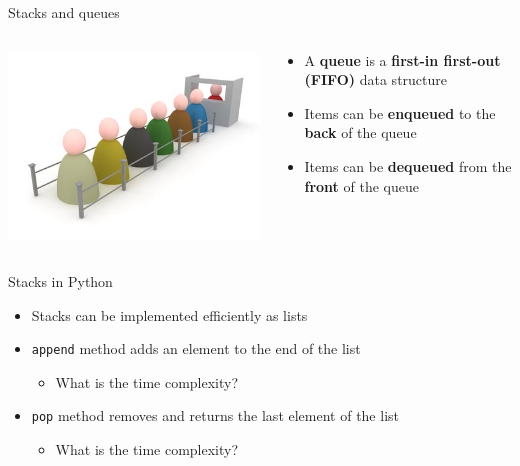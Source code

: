 \begin{frame}{Stacks and queues}
\begin{columns}
\begin{column}{0.3\textwidth}
			\includegraphics[width=\textwidth]{queue}
		\end{column}
		\begin{column}{0.68\textwidth}
			\begin{itemize}
				\item A \textbf{queue} is a \textbf{first-in first-out (FIFO)} data structure
				\pause\item Items can be \textbf{enqueued} to the \textbf{back} of the queue
				\pause\item Items can be \textbf{dequeued} from the \textbf{front} of the queue
			\end{itemize}
		\end{column}
	\end{columns}
\end{frame}

\begin{frame}{Stacks in Python}
	\begin{itemize}
		\pause\item Stacks can be implemented efficiently as lists
		\pause\item \lstinline{append} method adds an element to the end of the list
			\begin{itemize}
				\pause\item What is the time complexity?
			\end{itemize}
		\pause\item \lstinline{pop} method removes and returns the last element of the list
			\begin{itemize}
				\pause\item What is the time complexity?
			\end{itemize}
	\end{itemize}
\end{frame}

